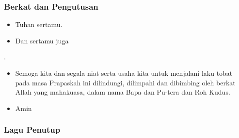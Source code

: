 \documentclass[a5paper,headsepline,titlepage,10pt,nnormalheadings,DIVcalc]{scrbook}
\newcommand{\BU}[1]{\begin{itemize} \item[U:] #1 \end{itemize}}
\newcommand{\BP}[1]{\begin{itemize} \item[P:] #1 \end{itemize}}
\begin{document}
\subsubsection*{Berkat dan Pengutusan}

\BP{Tuhan sertamu.}
\BU{Dan sertamu juga}.
\BP{Semoga kita dan segala niat serta usaha kita untuk menjalani laku tobat pada masa Prapaskah ini dilindungi, dilimpahi dan dibimbing oleh berkat Allah yang mahakuasa, dalam nama Bapa dan Pu-tera dan Roh Kudus.}
\BU{Amin}

\subsubsection*{Lagu Penutup}
\end{document}
